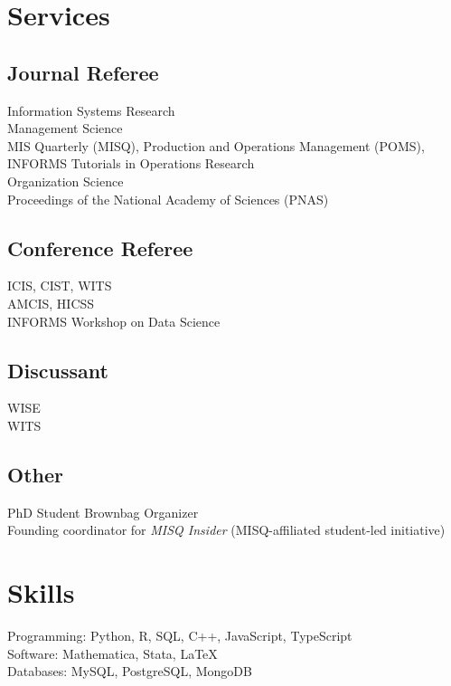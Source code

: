 \documentclass[11pt]{article} %
\begin{document}
\section*{Services}

\subsection*{Journal Referee}
 Information Systems Research\\
 Management Science \\
 MIS Quarterly (MISQ), Production and Operations Management (POMS), INFORMS Tutorials in Operations Research\\
 Organization Science\\
 Proceedings of the National Academy of Sciences (PNAS)

\subsection*{Conference Referee}

 ICIS, CIST, WITS \\
 AMCIS, HICSS \\
 INFORMS Workshop on Data Science

\subsection*{Discussant}

 WISE\\
 WITS

\subsection*{Other}
 PhD Student Brownbag Organizer\\
 Founding coordinator for \textit{MISQ Insider} (MISQ-affiliated student-led initiative)

\section*{Skills}
Programming: \hfill Python, R, SQL, C++, JavaScript, TypeScript\\
Software: \hfill Mathematica, Stata, \LaTeX \\
Databases: \hfill MySQL, PostgreSQL, MongoDB
\end{document}
